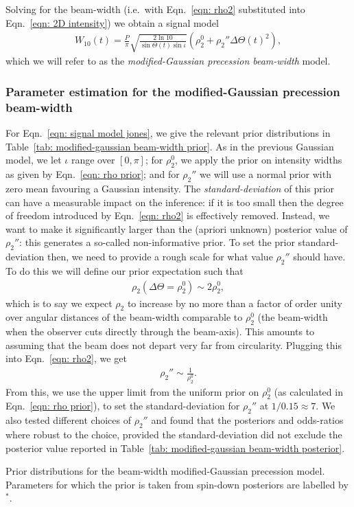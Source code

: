 \documentclass[../full_thesis/full_thesis.tex]{subfiles}
\newcommand{\thisdir}{../comparing_periodic_modulations}
\begin{document}
Solving for the beam-width (i.e.\ with Eqn.~\eqref{eqn: rho2} substituted into
Eqn.~\eqref{eqn: 2D intensity}) we obtain a signal model
\begin{align}
W_{10}(t) = \frac{P}{\pi}\sqrt{\frac{2\ln10}{\sin\Theta(t)\sin\iota}}
 \left(\rho_2^{0} + \rho_2'' \Delta\Theta(t)^{2} \right),
\label{eqn: signal model jones}
\end{align}
which we will refer to as the \emph{modified-Gaussian precession beam-width} model.

\subsubsection{Parameter estimation for the modified-Gaussian precession
               beam-width}

For Eqn.~\eqref{eqn: signal model jones}, we give the relevant prior distributions
in Table~\ref{tab: modified-gaussian beam-width prior}. As in the previous
Gaussian model, we let $\iota$ range over $[0, \pi]$; for $\rho_2^{0}$, we
apply the prior on intensity widths as given by Eqn.~\eqref{eqn: rho
prior}; and for $\rho_2''$ we will use a normal prior with zero mean
favouring a Gaussian intensity. The \emph{standard-deviation} of this prior can
have a measurable impact on the inference: if it is too small then the degree
of freedom introduced by Eqn.~\ref{eqn: rho2} is effectively removed. Instead,
we want to make it significantly larger than the (apriori unknown) posterior
value of $\rho_2''$: this generates a so-called non-informative prior. To set
the prior standard-deviation then, we need to provide a rough scale for what
value $\rho_{2}''$ should have. To do this we will define our prior expectation
such that
\begin{align}
\rho_2(\Delta\Theta = \rho_2^0) \sim 2\rho_2^0,
\label{eqn: rho2 prior}
\end{align}
which is to say we expect $\rho_2$ to increase by no more than a factor of
order unity over angular distances of the beam-width comparable to $\rho_2^0$
(the beam-width when the observer cuts directly through the beam-axis). This
amounts to assuming that the beam does not depart very far from circularity.
Plugging this into Eqn.~\eqref{eqn: rho2}, we get
\begin{align}
\rho_2'' \sim \frac{1}{\rho_2^0}.
\label{eqn: rho2dd prior}
\end{align}
From this, we use the upper limit from the uniform prior on $\rho_2^0$ (as calculated in
Eqn.~\eqref{eqn: rho prior}), to set the
standard-deviation for $\rho_2''$ at $1/0.15\approx7$.
We also tested different choices of $\rho_2''$ and found that the
posteriors and odds-ratios where robust to the choice, provided the
standard-deviation did not exclude the posterior value reported in
Table~\ref{tab: modified-gaussian beam-width posterior}.
\begin{table}[htb]
\small
\centering
\caption{Prior distributions for the beam-width modified-Gaussian precession
model. Parameters for which the prior is taken from spin-down posteriors are
labelled by $^{*}$.}
\label{tab: modified-gaussian beam-width prior}

\end{table}
\end{document}
